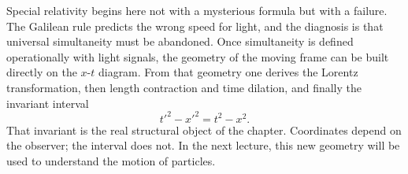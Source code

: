 Special relativity begins here not with a mysterious formula but with a failure. The Galilean rule predicts the wrong speed for light, and the diagnosis is that universal simultaneity must be abandoned. Once simultaneity is defined operationally with light signals, the geometry of the moving frame can be built directly on the \(x\)-\(t\) diagram. From that geometry one derives the Lorentz transformation, then length contraction and time dilation, and finally the invariant interval
\begin{equation}
t'^2-x'^2=t^2-x^2.
\end{equation}
That invariant is the real structural object of the chapter. Coordinates depend on the observer; the interval does not. In the next lecture, this new geometry will be used to understand the motion of particles.